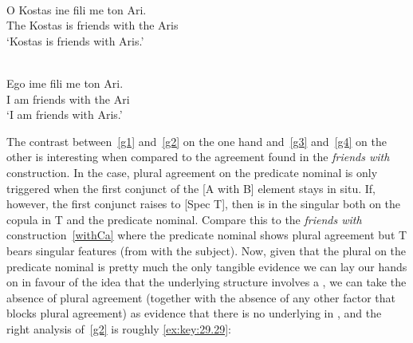\documentclass[output=paper]{langsci/langscibook}
\begin{document}
\ea\label{ex:key:29.27} \\
    \gll    \llap{*}O Kostas ine fili me ton Ari.\\
            The Kostas is friends with the Aris\\ \label{g3}
    \glt    \enquote*{Kostas is friends with Aris.}
\z

\ea\label{ex:key:29.28} \\
    \gll    \llap{*}Ego ime fili me ton Ari.\\
            I am friends with the Ari\\ \label{g4}
    \glt    \enquote*{I am friends with Aris.}
\z

The  contrast between~\eqref{g1} and~\eqref{g2} on the one hand
and~\eqref{g3} and~\eqref{g4} on the other is interesting when compared to the
agreement found in the  \emph{friends with} construction. In the
 case, plural agreement on the
predicate nominal is only triggered when the first conjunct of the [A with B]
element stays in situ. If, however, the first conjunct raises to [Spec T], then
 is in the singular both on the copula in T and the predicate
nominal. Compare this to the  \emph{friends with}
construction~\eqref{withCa} where the predicate nominal shows plural
agreement but T bears singular features (from
 with the subject).  Now, given that the plural on the predicate
nominal is pretty much the only tangible evidence we can lay our hands on in
favour of the idea that the underlying structure involves a ,
we can take the absence of plural agreement
(together with the absence of any other factor that blocks plural
agreement) as evidence that there is no
underlying  in , and the right analysis
of~\eqref{g2} is roughly \eqref{ex:key:29.29}:

\ea\label{ex:key:29.29}
\z
\end{document}
